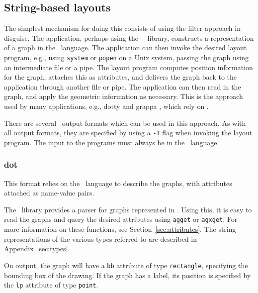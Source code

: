 \subsection{String-based layouts}
The simplest mechanism for doing this consists of using the filter
approach in disguise. The application, perhaps using the \gviz\ \graph\
library, constructs a representation of a graph in the
\DOT\ language. The application can then invoke the desired layout
program, e.g., using {\tt system} or {\tt popen} on a Unix system, 
passing the graph using an intermediate file or a pipe. The layout
program computes position information for the graph, attaches this
as attributes, and delivers the graph back to the application through
another file or pipe. The application can then read in the graph,
and apply the geometric information as necessary. This is the
approach used by many applications, e.g., dotty \cite{dotty} and
grappa \cite{grappa}, which
rely on \gviz.

There are several \gviz\ output formats which can be used in this
approach. As with all output formats, they are specified by 
using a {\tt -T} flag when invoking the layout program. 
The input to the programs must always be in the \DOT\ language.

\subsubsection{dot}
\label{sect:dot}
This format relies on the \DOT\ language to describe the graphs, with attributes
attached as name-value pairs.

The \graph\ library provides a parser for graphs represented
in \DOT. Using this, it is easy to read the graphs and query the
desired attributes using {\tt agget} or {\tt agxget}.
For more information on these functions, see Section~\ref{sec:attributes}.
The string representations of the various types referred to are
described in Appendix~\ref{sec:types}.

On output, the graph will have a {\tt bb} attribute of type {\tt rectangle}, 
specifying the bounding box of the drawing. 
If the graph has a label, its position is specified by the {\tt lp}
attribute of type {\tt point}.

